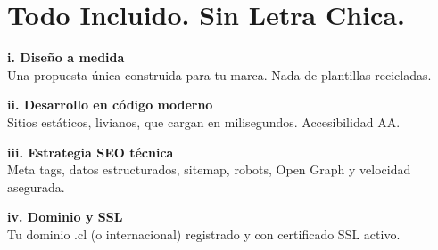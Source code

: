 \documentclass[11pt, a4paper]{article}
\begin{document}
  \vspace{8mm}

  \section*{Todo Incluido. Sin Letra Chica.}

  \vspace{2mm}

  \noindent
  \begin{minipage}[t]{0.48\textwidth}
    \textbf{\color{darkslate}
    i. Diseño a medida} \\[1mm]
    {\small\color{basicgray}Una propuesta única construida para tu marca. Nada de plantillas recicladas.}

    \vspace{3mm}

    \textbf{\color{darkslate}
    ii. Desarrollo en código moderno} \\[1mm] {\small\color{basicgray}Sitios estáticos, livianos, que cargan en milisegundos. Accesibilidad AA.}

    \vspace{3mm}

    \textbf{\color{darkslate}
    iii. Estrategia SEO técnica} \\[1mm]
    {\small\color{basicgray}Meta tags, datos estructurados, sitemap, robots, Open Graph y velocidad asegurada.}

    \vspace{3mm}

    \textbf{\color{darkslate}
    iv. Dominio y SSL} \\[1mm] {\small\color{basicgray}Tu dominio .cl (o internacional) registrado y con certificado SSL activo.}
  \end{minipage}
  \hfill
\end{document}
